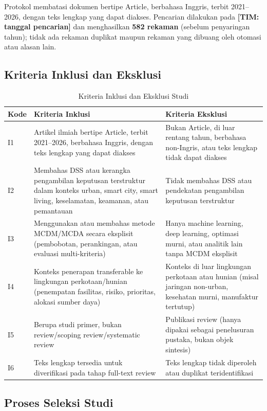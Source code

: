 \documentclass[conference]{IEEEtran}
\begin{document}
Protokol membatasi dokumen bertipe Article, berbahasa Inggris, terbit 2021--2026, dengan teks lengkap yang dapat diakses. Pencarian dilakukan pada \textbf{[TIM: tanggal pencarian]} dan menghasilkan \textbf{582 rekaman} (sebelum penyaringan tahun); tidak ada rekaman duplikat maupun rekaman yang dibuang oleh otomasi atau alasan lain.

\subsection{Kriteria Inklusi dan Eksklusi}

\begin{table}[htbp]
\caption{Kriteria Inklusi dan Eksklusi Studi}
\label{tab:kriteria}
\centering
\begin{tabular}{p{0.6cm}p{3.5cm}p{3.5cm}}
\toprule
\textbf{Kode} & \textbf{Kriteria Inklusi} & \textbf{Kriteria Eksklusi} \\
\midrule
I1 & Artikel ilmiah bertipe Article, terbit 2021--2026, berbahasa Inggris, dengan teks lengkap yang dapat diakses & Bukan Article, di luar rentang tahun, berbahasa non-Ingris, atau teks lengkap tidak dapat diakses \\
I2 & Membahas DSS atau kerangka pengambilan keputusan terstruktur dalam konteks urban, smart city, smart living, keselamatan, keamanan, atau pemantauan & Tidak membahas DSS atau pendekatan pengambilan keputusan terstruktur \\
I3 & Menggunakan atau membahas metode MCDM/MCDA secara eksplisit (pembobotan, perankingan, atau evaluasi multi-kriteria) & Hanya machine learning, deep learning, optimasi murni, atau analitik lain tanpa MCDM eksplisit \\
I4 & Konteks penerapan transferable ke lingkungan perkotaan/hunian (penempatan fasilitas, risiko, prioritas, alokasi sumber daya) & Konteks di luar lingkungan perkotaan atau hunian (misal jaringan non-urban, kesehatan murni, manufaktur tertutup) \\
I5 & Berupa studi primer, bukan review/scoping review/systematic review & Publikasi review (hanya dipakai sebagai penelusuran pustaka, bukan objek sintesis) \\
I6 & Teks lengkap tersedia untuk diverifikasi pada tahap full-text review & Teks lengkap tidak diperoleh atau duplikat teridentifikasi \\
\bottomrule
\end{tabular}
\end{table}

\subsection{Proses Seleksi Studi}
\end{document}
